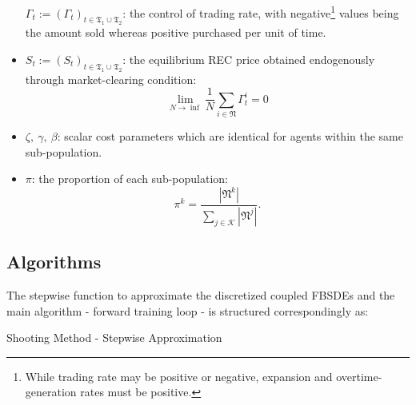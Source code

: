 \documentclass[a4paper,10pt]{article}
\newcommand{\1}{\mathbf{1}}
\begin{document}
\begin{itemize}
  \(\Gamma_t := (\Gamma_t)_{t\in\mathfrak{T_1} \cup \mathfrak{T_2}}\):
  the control of trading rate, with negative\footnote{While trading rate
    may be positive or negative, expansion and overtime-generation rates
    must be positive.} values being the amount sold whereas positive
  purchased per unit of time.
\item
  \(S_t := (S_t)_{t\in\mathfrak{T_1} \cup \mathfrak{T_2}}\): the
  equilibrium REC price obtained endogenously through market-clearing
  condition:
  \[\lim\limits_{N \to \inf}{\frac{1}{N} \sum\limits_{i\in\mathfrak{N}}{\Gamma^i_t}}=0\]
\item
  \(\zeta,~\gamma,~\beta\): scalar cost parameters which are identical
  for agents within the same sub-population.
\item
  \(\pi\): the proportion of each sub-population:
  \[\pi^k=\frac{|\mathfrak{N}^k|}{\sum\limits_{j \in \mathcal{K}}{|\mathfrak{N}^j|}}.\]
\end{itemize}

\newpage
\hypertarget{Algorithms}{\subsection*{Algorithms}}

The stepwise function to approximate the discretized coupled FBSDEs and the main algorithm - forward training loop - is structured correspondingly as:

\begin{algorithm}[ht]
\BlankLine
{}
\caption{Shooting Method - Stepwise Approximation} 
\label{alg:stepwise-approx}
\end{algorithm}
\end{document}
